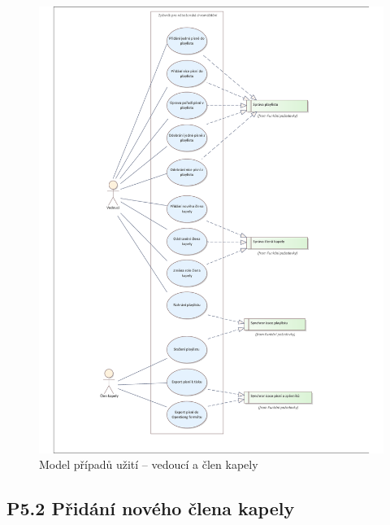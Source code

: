 \begin{figure}
    \includegraphics[width=\textwidth]{images/3-navrh/3-3-uc-model-2.pdf}
    \caption{Model případů užití -- vedoucí a člen kapely}
\end{figure}

\subsection{P5.2 Přidání nového člena kapely}
\label{P5.2}

